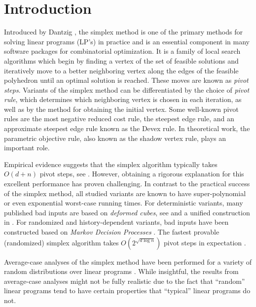 \documentclass{theoretics}
\begin{document}



\section{Introduction}

Introduced by Dantzig \cite{dan51},
the simplex method is one of the primary methods
for solving linear programs (LP's) in practice and is an essential component in many software packages
for combinatorial optimization.
It is a family of local search algorithms which begin by finding a vertex of the set of feasible solutions
and iteratively move to a better neighboring vertex along
the edges of the feasible polyhedron until an optimal solution is reached. These moves are known as \emph{pivot steps}.
Variants of the simplex method can be differentiated by the choice of \emph{pivot rule},
which determines which neighboring vertex is chosen in each iteration,
as well as by the method for obtaining the initial vertex.
Some well-known pivot rules are the most negative reduced cost rule,
the steepest edge rule, and an approximate steepest edge rule known as the
Devex rule.  In theoretical work, the parametric objective rule, also known as
the shadow vertex rule, plays an important role.

Empirical evidence suggests that the simplex algorithm typically takes $O(d + n)$ pivot steps, see
\cite{sha87, andrei2004complexity, Goldfarb1994}.
However, obtaining a rigorous explanation for this excellent
performance has proven challenging.
In contrast to the practical success of the simplex method, all studied variants
are known to have super-polynomial or even exponential worst-case running times.
For deterministic variants, many published bad inputs are based on \emph{deformed cubes},
see \cite{km72, jer73, AC78, GS79, Mur80, gol76} and a unified construction
in \cite{jour/cm/AZ98}.
For randomized and history-dependent variants, bad inputs have been constructed
based on \emph{Markov Decision Processes}
\cite{k92, msw96, conf/stoc/FHZ11, conf/ipco/Friedmann11, hz15, disser2020exponential}.
The fastest provable (randomized) simplex algorithm takes
$O(2^{\sqrt{d\log n}})$ pivot steps in expectation \cite{k92, msw96, hz15}.

Average-case analyses of the simplex method have been performed for a variety of random distributions over linear programs
\cite{b82,b87,b99, jour/mapr/Smale83, report/Haimovich83, jour/mapr/Megiddo86, jour/jc/AKS87, jour/mapr/Todd86, jour/jacm/AM85}.
While insightful, the results from average-case analyses might not be fully realistic due to the fact that ``random''
linear programs tend to have certain properties that ``typical'' linear programs do not.
\end{document}
